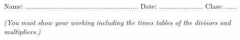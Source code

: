 \documentclass{article}
\date{}
\begin{document}
\fontsize{13}{15} \selectfont %

\begin{center}
  \qquad \\ 
\end{center} \\ 

Name: ...........................................................  \hspace{0.5cm}  Date: ....................... \hspace{0.5cm}  Class: ......\hspace{0.5cm} %

\par
\vspace*{5pt} 
\textit{(You must show your working including the times tables of the divisors and multipliers.)  }

\end{document}
